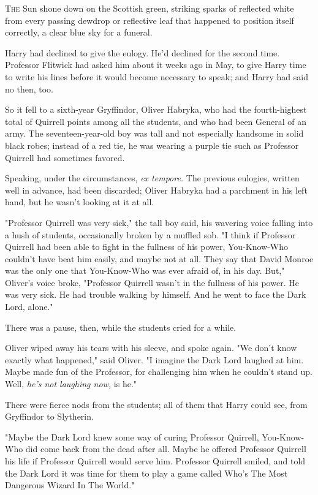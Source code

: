 
\lettrine{T}{he} Sun shone
down on the Scottish green, striking sparks of reflected white from every
passing dewdrop or reflective leaf that happened to position itself correctly,
a clear blue sky for a funeral.

Harry had declined to give the eulogy. He'd declined for the second time.
Professor Flitwick had asked him about it weeks ago in May, to give Harry time
to write his lines before it would become necessary to speak; and Harry had
said no then, too.

So it fell to a sixth-year Gryffindor, Oliver Habryka, who had the
fourth-highest total of Quirrell points among all the students, and who had
been General of an army. The seventeen-year-old boy was tall and not especially
handsome in solid black robes; instead of a red tie, he was wearing a purple
tie such as Professor Quirrell had sometimes favored.

Speaking, under the circumstances, \emph{ex tempore.} The previous eulogies,
written well in advance, had been discarded; Oliver Habryka had a parchment in
his left hand, but he wasn't looking at it at all.

"Professor Quirrell was very sick," the tall boy said, his wavering voice
falling into a hush of students, occasionally broken by a muffled sob. "I think
if Professor Quirrell had been able to fight in the fullness of his power,
You-Know-Who couldn't have beat him easily, and maybe not at all. They say that
David Monroe was the only one that You-Know-Who was ever afraid of, in his day.
But," Oliver's voice broke, "Professor Quirrell wasn't in the fullness of his
power. He was very sick. He had trouble walking by himself. And he went to face
the Dark Lord, alone."

There was a pause, then, while the students cried for a while.

Oliver wiped away his tears with his sleeve, and spoke again. "We don't know
exactly what happened," said Oliver. "I imagine the Dark Lord laughed at him.
Maybe made fun of the Professor, for challenging him when he couldn't stand up.
Well, \emph{he's not laughing now,} is he."

There were fierce nods from the students; all of them that Harry could see,
from Gryffindor to Slytherin.

"Maybe the Dark Lord knew some way of curing Professor Quirrell, You-Know-Who
did come back from the dead after all. Maybe he offered Professor Quirrell his
life if Professor Quirrell would serve him. Professor Quirrell smiled, and told
the Dark Lord it was time for them to play a game called Who's The Most
Dangerous Wizard In The World."

